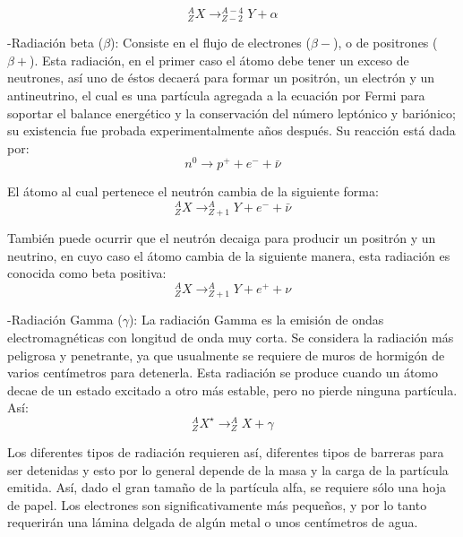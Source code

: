 \documentclass[%
 reprint,
 amsmath,amssymb,
 aps,
]{revtex4-1}
\begin{document}
\begin{equation}
	^{A}_{Z}X \to ^{A-4}_{Z-2}Y+\alpha
\end{equation}

-Radiación beta ($ \beta $): Consiste en el flujo de electrones ($ \beta - $), o de positrones ($ \beta + $). Esta radiación, en el primer caso el átomo debe tener un exceso de neutrones, así uno de éstos decaerá para formar un positrón, un electrón y un antineutrino, el cual es una partícula agregada a la ecuación por Fermi para soportar el balance energético y la conservación del número leptónico y bariónico; su existencia fue probada experimentalmente años después. Su reacción está dada por:\\

\begin{equation}
	n^0 \to p^{+} + e^{-} + \bar{\nu}
\end{equation}

El átomo al cual pertenece el neutrón cambia de la siguiente forma: \\

\begin{equation}
	^{A}_{Z}X \to ^{A}_{Z+1}Y + e^{-} + \bar{\nu}
\end{equation}

También puede ocurrir que el neutrón decaiga para producir un positrón y un neutrino, en cuyo caso el átomo cambia de la siguiente manera, esta radiación es conocida como beta positiva:\\

\begin{equation}
^{A}_{Z}X \to ^{A}_{Z+1}Y + e^{+} + \nu
\end{equation}

-Radiación Gamma ($ \gamma $): La radiación Gamma es la emisión de ondas electromagnéticas con longitud de onda muy corta. Se considera la radiación más peligrosa y penetrante, ya que usualmente se requiere de muros de hormigón de varios centímetros para detenerla. Esta radiación se produce cuando un átomo decae de un estado excitado a otro más estable, pero no pierde ninguna partícula. Así:\\

\begin{equation}
	^{A}_{Z}X^{\star} \to ^{A}_{Z}X + \gamma 
\end{equation}

Los diferentes tipos de radiación requieren así, diferentes tipos de barreras para ser detenidas y esto por lo general depende de la masa y la carga de la partícula emitida. Así, dado el gran tamaño de la partícula alfa, se requiere sólo una hoja de papel. Los electrones son significativamente más pequeños, y por lo tanto requerirán una lámina delgada de algún metal o unos centímetros de agua.\\
\end{document}
